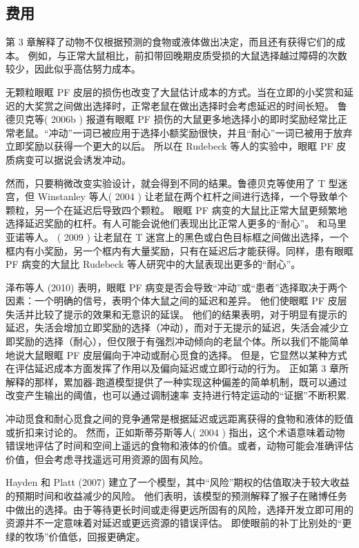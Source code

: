 \subsection{费用}
第 3 章解释了动物不仅根据预测的食物或液体做出决定，而且还有获得它们的成本。 例如，与正常大鼠相比，前扣带回晚期皮质受损的大鼠选择越过障碍的次数较少，因此似乎高估努力成本。\par
无颗粒眼眶 PF 皮层的损伤也改变了大鼠估计成本的方式。当在立即的小奖赏和延迟的大奖赏之间做出选择时，正常老鼠在做出选择时会考虑延迟的时间长短。 鲁德贝克等( 2006b ) 报道有眼眶 PF 损伤的大鼠更多地选择小的即时奖励经常比正常老鼠。“冲动”一词已被应用于选择小额奖励很快，并且“耐心”一词已被用于放弃立即奖励以获得一个更大的以后。 所以在 Rudebeck 等人的实验中，眼眶 PF 皮质病变可以据说会诱发冲动。\par
然而，只要稍微改变实验设计，就会得到不同的结果。鲁德贝克等使用了 T 型迷宫，但 Winstanley 等人( 2004 ) 让老鼠在两个杠杆之间进行选择，一个导致单个颗粒，另一个在延迟后导致四个颗粒。 眼眶 PF 病变的大鼠比正常大鼠更频繁地选择延迟奖励的杠杆。有人可能会说他们表现出比正常人更多的“耐心”。 和马里亚诺等人。 ( 2009 ) 让老鼠在 T 迷宫上的黑色或白色目标框之间做出选择，一个框内有小奖励，另一个框内有大量奖励，只有在延迟后才能获得。同样，患有眼眶 PF 病变的大鼠比 Rudebeck 等人研究中的大鼠表现出更多的“耐心”。\par
泽布等人 (2010) 表明，眼眶 PF 病变是否会导致“冲动”或“患者”选择取决于两个因素：一个明确的信号，表明个体大鼠之间的延迟和差异。 他们使眼眶 PF 皮层失活并比较了提示的效果和无意识的延误。 他们的结果表明，对于明显有提示的延迟，失活会增加立即奖励的选择（冲动），而对于无提示的延迟，失活会减少立即奖励的选择（耐心），但仅限于有强烈冲动倾向的老鼠个体。所以我们不能简单地说大鼠眼眶 PF 皮层偏向于冲动或耐心觅食的选择。 但是，它显然以某种方式在评估延迟成本方面发挥了作用以及偏向延迟或立即行动的行为。 正如第 3 章所解释的那样，累加器-跑道模型提供了一种实现这种偏差的简单机制，既可以通过改变产生输出的阈值，也可以通过调制速率
支持进行特定运动的“证据”不断积累. \par
冲动觅食和耐心觅食之间的竞争通常是根据延迟或远距离获得的食物和液体的贬值或折扣来讨论的。 然而，正如斯蒂芬斯等人( 2004 ) 指出，这个术语意味着动物错误地评估了时间和空间上遥远的食物和液体的价值。或者，动物可能会准确评估价值，但会考虑寻找遥远可用资源的固有风险。 \par
Hayden 和 Platt (2007) 建立了一个模型，其中“风险”期权的估值取决于较大收益的预期时间和收益减少的风险。 他们表明，该模型的预测解释了猴子在赌博任务中做出的选择。由于等待更长时间或走得更远所固有的风险，选择开发立即可用的资源并不一定意味着对延迟或更远资源的错误评估。 即使眼前的补丁比别处的“更绿的牧场”价值低，回报更确定。
